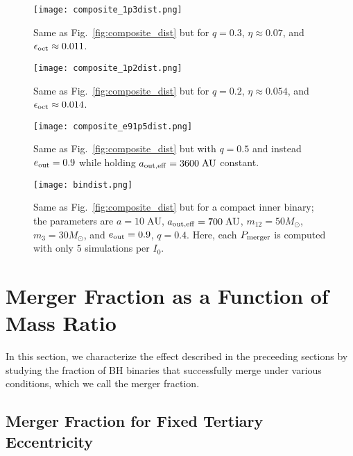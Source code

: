 \documentclass[
        fleqn,
        usenatbib,
    ]{mnras}
\newlength{\colummwidth}
\begin{document}
\begin{figure}
    \centering
    \texttt{[image: composite\_1p3dist.png]}
    \caption{Same as Fig.~\ref{fig:composite_dist} but for $q = 0.3$, $\eta
    \approx 0.07$, and $\epsilon_{\rm oct} \approx 0.011$.}\label{fig:composite_1p3}
\end{figure}
\begin{figure}
    \centering
    \texttt{[image: composite\_1p2dist.png]}
    \caption{Same as Fig.~\ref{fig:composite_dist} but for $q = 0.2$, $\eta
    \approx 0.054$, and $\epsilon_{\rm oct} \approx 0.014$.
    }\label{fig:composite_1p2}
\end{figure}
\begin{figure}
    \centering
    \texttt{[image: composite\_e91p5dist.png]}
    \caption{Same as Fig.~\ref{fig:composite_dist} but with $q = 0.5$ and
    instead $e_{\rm out} = 0.9$ while holding $a_{\rm out, eff} =
    3600\;\mathrm{AU}$ constant. }\label{fig:composite_e91p5}
\end{figure}
\begin{figure}
    \centering
    \texttt{[image: bindist.png]}
    \caption{Same as Fig.~\ref{fig:composite_dist} but for a compact inner
    binary; the parameters are $a = 10\;\mathrm{AU}$, $a_{\rm out, eff} =
    700\;\mathrm{AU}$, $m_{12} = 50M_{\odot}$, $m_3 = 30M_{\odot}$, and $e_{\rm
    out} = 0.9$, $q = 0.4$. Here, each $P_{\rm merger}$ is computed with only
    $5$ simulations per $I_0$.}\label{fig:composite_bindist}
\end{figure}

\section{Merger Fraction as a Function of Mass Ratio}\label{s:merger_frac}

In this section, we characterize the effect described in the preceeding sections
by studying the fraction of BH binaries that successfully merge under various
conditions, which we call the merger fraction.

\subsection{Merger Fraction for Fixed Tertiary Eccentricity}
\end{document}
